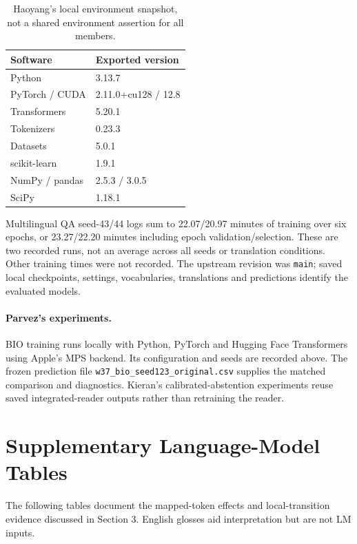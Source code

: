 \documentclass[11pt]{article}
\begin{document}
\begin{table}[H]
\centering\small
\begin{tabular}{ll}
\toprule
Software & Exported version\\
\midrule
Python & 3.13.7\\
PyTorch / CUDA & 2.11.0+cu128 / 12.8\\
Transformers & 5.20.1\\
Tokenizers & 0.23.3\\
Datasets & 5.0.1\\
scikit-learn & 1.9.1\\
NumPy / pandas & 2.5.3 / 3.0.5\\
SciPy & 1.18.1\\
\bottomrule
\end{tabular}
\caption{Haoyang's local environment snapshot, not a shared environment assertion for all members.}
\label{tab:environment}
\end{table}
Multilingual QA seed-43/44 logs sum to 22.07/20.97 minutes of training over six epochs, or 23.27/22.20 minutes including epoch validation/selection. These are two recorded runs, not an average across all seeds or translation conditions. Other training times were not recorded. The upstream revision was \texttt{main}; saved local checkpoints, settings, vocabularies, translations and predictions identify the evaluated models.

\paragraph{Parvez's experiments.}
BIO training runs locally with Python, PyTorch and Hugging Face Transformers using Apple's MPS backend. Its configuration and seeds are recorded above. The frozen prediction file \texttt{w37\_bio\_seed123\_original.csv} supplies the matched comparison and diagnostics. Kieran's calibrated-abstention experiments reuse saved integrated-reader outputs rather than retraining the reader.

\section{Supplementary Language-Model Tables}
\label{app:lm}
The following tables document the mapped-token effects and local-transition evidence discussed in Section 3. English glosses aid interpretation but are not LM inputs.
\end{document}

